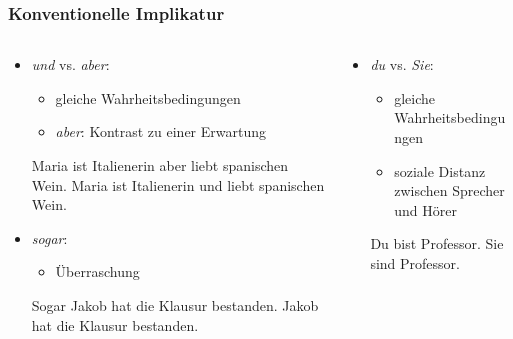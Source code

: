 \begin{frame}
\frametitle{Konventionelle Implikatur}

\begin{columns}
\begin{column}[t]{0.6\textwidth}
	\begin{itemize}
		
		\item \textit{und} vs. \textit{aber}:
		
		\begin{itemize}
			\item gleiche Wahrheitsbedingungen
			\item \textit{aber}: Kontrast zu einer Erwartung
		\end{itemize}
	
		\eal 
		\ex Maria ist Italienerin aber liebt spanischen Wein.
		\ex Maria ist Italienerin und liebt spanischen Wein.
		\zl
	
		\item \textit{sogar}:
		
		\begin{itemize}
			\item Überraschung
		\end{itemize}
	
		\eal 
		\ex Sogar Jakob hat die Klausur bestanden.	
		\ex Jakob hat die Klausur bestanden.
		\zl
	
	\end{itemize}
	
\end{column}
\begin{column}[t]{0.4\textwidth}
	
\begin{itemize}

	\item \textit{du} vs. \textit{Sie}:
	
	\begin{itemize}
		\item gleiche Wahrheitsbedingungen
		\item soziale Distanz zwischen Sprecher und Hörer
	\end{itemize}

		\eal
		\ex Du bist Professor.
		\ex Sie sind Professor.
		\zl
	
\end{itemize}

\end{column}
\end{columns}



\end{frame}
